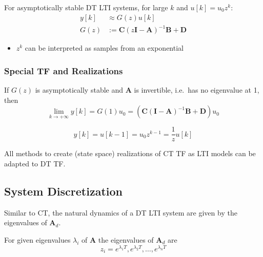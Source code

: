 
For asymptotically stable DT LTI systems, for large $k$ and $u[k]=u_0 z^k$:
\begin{align*}
    y[k] & \approx G(z)u[k]                                                 \\
    G(z) & :=\mathbf{C}{(z\mathbf{I}-\mathbf{A})}^{-1}\mathbf{B}+\mathbf{D}
\end{align*}

\newpar{}
\begin{itemize}
    \item $z^k$ can be interpreted as samples from an exponential
\end{itemize}

\subsubsection{Special TF and Realizations}

If $G(z)$ is asymptotically stable and $\mathbf{A}$ is invertible, i.e.\ has no eigenvalue at 1, then
\begin{equation*}
    \lim_{k\to+\infty}y[k]=G(1)u_0=(\mathbf{C}{(\mathbf{I}-\mathbf{A})}^{-1}\mathbf{B}+\mathbf{D})u_0
\end{equation*}


\begin{equation*}
    y[k] =u[k-1] =u_0z^{k-1}=\frac1zu[k]
\end{equation*}


All methods to create (state space) realizations of CT TF as LTI models can be adapted to DT TF.\

\subsection{System Discretization}

Similar to CT, the natural dynamics of a DT LTI system are given by the eigenvalues of $\mathbf{A}_d$.

For given eigenvalues $\lambda_i$ of $\mathbf{A}$ the eigenvalues of $\mathbf{A}_d$ are
\begin{equation*}
    z_i=e^{\lambda_1T},e^{\lambda_2T},\ldots,e^{\lambda_{n}T}
\end{equation*}


